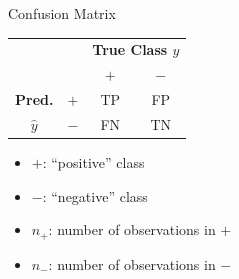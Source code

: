 \documentclass[11pt,compress,t,notes=noshow, xcolor=table]{beamer}
\begin{document}
% 
% 

% 
% 


\begin{vbframe}{Confusion Matrix}

\begin{center}
\small
\renewcommand{\arraystretch}{1.5}
\begin{tabular}{cc||cc}
    & & \multicolumn{2}{c}{\bfseries True Class $y$}  \\
    & & $+$ & $-$  \\ 
    \hline \hline
    \bfseries Pred.     & $+$ & TP & FP\\
              $\hat{y}$ & $-$ & FN & TN\\ 
\end{tabular}
\renewcommand{\arraystretch}{1}
\end{center}

\begin{itemize}
  \item $+$: \enquote{positive} class
  \item $-$: \enquote{negative} class
  \item $n_+$: number of observations in $+$
  \item $n_-$: number of observations in $-$
\end{itemize}
\end{vbframe}
\end{document}
